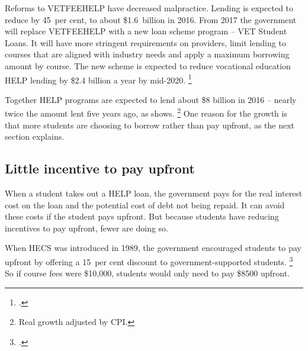 \documentclass{grattan}
\begin{document}
Reforms to \gls{VETFEEHELP} have decreased malpractice.
Lending is expected to reduce by 45~per cent, to about \$1.6~billion in 2016.
From 2017 the government will replace \gls{VETFEEHELP} with a new loan scheme program -- VET Student Loans. It will have more stringent requirements on providers, limit lending to courses that are aligned with industry needs and apply a maximum borrowing amount by course.
The new scheme is expected to reduce vocational education \gls{HELP} lending by \$2.4 billion a year by mid-2020.%
   \footnote{\textcites{Birmingham2016MediareleaseNew}.}

Together \gls{HELP} programs are expected to lend about \$8 billion in 2016 -- nearly twice the amount lent five years ago, as  shows.%
   \footnote{Real growth adjusted by \gls{CPI}.} 
One reason for the growth is that more students are choosing to borrow rather than pay upfront, as the next section explains.

\subsection{Little incentive to pay upfront}\label{subsec:little-incentive-to-pay-upfront}

When a student takes out a \gls{HELP} loan, the government pays for the real interest cost on the loan and the potential cost of debt not being repaid.
It can avoid these costs if the student pays upfront. But because students have reducing incentives to pay upfront, fewer are doing so. 

When \gls{HECS} was introduced in 1989, the government encouraged students to pay upfront by offering a 15~per cent discount to government-supported students.%
\footcite[][79]{Wran1988ReportCommitteeHigher} 
So if course fees were \$10,000, students would only need to pay \$8500 upfront.
\end{document}

